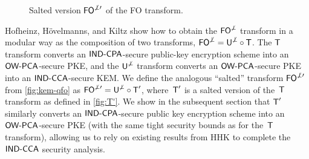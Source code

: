 \documentclass{iacrcc}
\begin{document}
\begin{figure}[h]
\centering
{}
\caption{Salted version $\FOnotperpprime$ of the FO transform.}
\label{fig:kem-qfo}
\end{figure}

Hofheinz, H{\" o}velmanns, and Kiltz \cite{TCC:HofHovKil17} show how to obtain the $\FOnotperp$ transform in a modular way as the composition of two transforms, $\FOnotperp = \Unotperp \circ \T$.
The $\T$ transform converts an $\INDCPA$-secure public-key encryption scheme into an $\OWPCA$-secure PKE, and the $\Unotperp$ transform converts an $\OWPCA$-secure PKE into an $\INDCCA$-secure KEM.\@
We define the analogous ``salted'' transform $\FOnotperpprime$ from \autoref{fig:kem-qfo} as $\FOnotperpprime = \Unotperp \circ \T'$, where~$\T'$ is a salted version of the~$\T$ transform as defined in \autoref{fig:T'}.
We show in the subsequent section that $\T'$ similarly converts an $\INDCPA$-secure public key encryption scheme into an $\OWPCA$-secure PKE (with the same tight security bounds as for the~$\T$ transform), allowing us to rely on existing results from HHK to complete the $\INDCCA$ security analysis.
\end{document}

